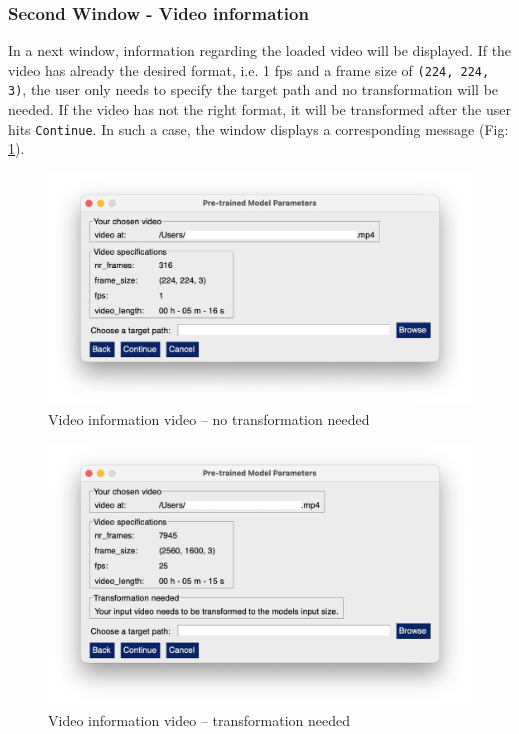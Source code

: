 \documentclass{article}
\begin{document}
\subsubsection{Second Window - Video information}
In a next window, information regarding the loaded video will be displayed. If the video has already the desired format, i.e. 1 fps and a frame size of \texttt{(224, 224, 3)}, the user only needs to specify the target path and no transformation will be needed. If the video has not the right format, it will be transformed after the user hits \texttt{Continue}. In such a case, the window displays a corresponding message (Fig: \ref{fig:output}).
\begin{figure}[H]
    \centering
    \includegraphics[width = \linewidth]{Output_window.jpg}
    \caption{Video information video -- no transformation needed}
\end{figure}

\begin{figure}[H]
    \centering
    \includegraphics[width = \linewidth]{Transformation_window.jpg}
    \caption{Video information video -- transformation needed}
    \label{fig:output}
\end{figure}
\end{document}
